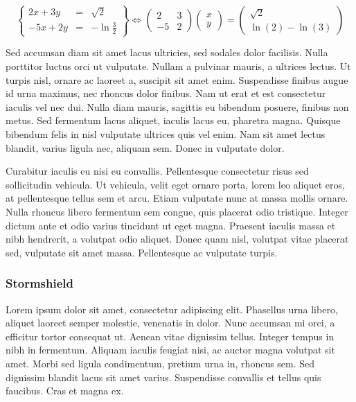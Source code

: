 \documentclass{report}
\begin{document}
$$
\begin{Bmatrix}
2x+3y & = & \sqrt{2}\\
-5x + 2y & = & -\ln{\frac{3}{2}}
\end{Bmatrix}
\Longleftrightarrow
\begin{pmatrix}
2 & 3\\
-5 & 2
\end{pmatrix}
\begin{pmatrix}
x\\
y
\end{pmatrix}
=
\begin{pmatrix}
\sqrt{2}\\
\ln{(2)} - \ln{(3)}
\end{pmatrix}
$$

Sed accumsan diam sit amet lacus ultricies, sed sodales dolor facilisis. Nulla porttitor luctus orci ut vulputate. Nullam a pulvinar mauris, a ultrices lectus. Ut turpis nisl, ornare ac laoreet a, suscipit sit amet enim. Suspendisse finibus augue id urna maximus, nec rhoncus dolor finibus. Nam ut erat et est consectetur iaculis vel nec dui. Nulla diam mauris, sagittis eu bibendum posuere, finibus non metus. Sed fermentum lacus aliquet, iaculis lacus eu, pharetra magna. Quisque bibendum felis in nisl vulputate ultrices quis vel enim. Nam sit amet lectus blandit, varius ligula nec, aliquam sem. Donec in vulputate dolor.

Curabitur iaculis eu nisi eu convallis. Pellentesque consectetur risus sed sollicitudin vehicula. Ut vehicula, velit eget ornare porta, lorem leo aliquet eros, at pellentesque tellus sem et arcu. Etiam vulputate nunc at massa mollis ornare. Nulla rhoncus libero fermentum sem congue, quis placerat odio tristique. Integer dictum ante et odio varius tincidunt ut eget magna. Praesent iaculis massa et nibh hendrerit, a volutpat odio aliquet. Donec quam nisl, volutpat vitae placerat sed, vulputate sit amet massa. Pellentesque ac vulputate turpis.

\subsubsection{Stormshield}
Lorem ipsum dolor sit amet, consectetur adipiscing elit. Phasellus urna libero, aliquet laoreet semper molestie, venenatis in dolor. Nunc accumsan mi orci, a efficitur tortor consequat ut. Aenean vitae dignissim tellus. Integer tempus in nibh in fermentum. Aliquam iaculis feugiat nisi, ac auctor magna volutpat sit amet. Morbi sed ligula condimentum, pretium urna in, rhoncus sem. Sed dignissim blandit lacus sit amet varius. Suspendisse convallis et tellus quis faucibus. Cras et magna ex.
\end{document}
